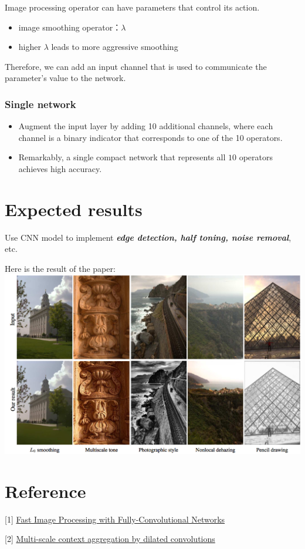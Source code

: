 \documentclass{article}
\newcommand{\tb}{\textbf}
\begin{document}
Image processing operator can have parameters that control its action.

\begin{itemize}
    \item image smoothing operator：$\lambda$
    \item higher $\lambda$ leads to more aggressive smoothing
\end{itemize}

Therefore, we can add an input channel that is used to communicate the parameter's value to the network.

\subsubsection*{Single network}

\begin{itemize}
    \item Augment the input layer by adding 10 additional channels, where each channel is a binary indicator that corresponds to one of the 10 operators.
    \item Remarkably, a single compact network that represents all $10$ operators achieves high accuracy.
\end{itemize}

\section*{Expected results}

Use CNN model to implement \textsl{\tb{edge detection, half toning, noise removal}}, etc.

Here is the result of the paper: \\

\includegraphics[width=\textwidth]{img/img.png}

\section*{Reference}

[1] \href{http://openaccess.thecvf.com/content_ICCV_2017/papers/Chen_Fast_Image_Processing_ICCV_2017_paper.pdf}{Fast Image Processing with Fully-Convolutional Networks}

[2] \href{https://arxiv.org/pdf/1511.07122.pdf}{Multi-scale context aggregation by dilated convolutions}
\end{document}
